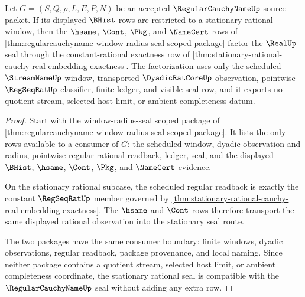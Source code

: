 \begin{theorem}
\label{thm:regularcauchyname-stationary-rational-seal-compatibility}
Let $G=(S,Q,\rho,L,E,P,N)$ be an accepted $\RegularCauchyNameUp$ source packet. If its displayed $\BHist$ rows are restricted to a stationary rational window, then the $\hsame$, $\Cont$, $\Pkg$, and $\NameCert$ rows of \autoref{thm:regularcauchyname-window-radius-seal-scoped-package} factor the $\RealUp$ seal through the constant-rational exactness row of \autoref{thm:stationary-rational-cauchy-real-embedding-exactness}. The factorization uses only the scheduled $\StreamNameUp$ window, transported $\DyadicRatCoreUp$ observation, pointwise $\RegSeqRatUp$ classifier, finite ledger, and visible seal row, and it exports no quotient stream, selected host limit, or ambient completeness datum.
\end{theorem}
\begin{proof}
Start with the window-radius-seal scoped package of \autoref{thm:regularcauchyname-window-radius-seal-scoped-package}. It lists the only rows available to a consumer of $G$: the scheduled window, dyadic observation and radius, pointwise regular rational readback, ledger, seal, and the displayed $\BHist$, $\hsame$, $\Cont$, $\Pkg$, and $\NameCert$ evidence.

On the stationary rational subcase, the scheduled regular readback is exactly the constant $\RegSeqRatUp$ member governed by \autoref{thm:stationary-rational-cauchy-real-embedding-exactness}. The $\hsame$ and $\Cont$ rows therefore transport the same displayed rational observation into the stationary seal route.

The two packages have the same consumer boundary: finite windows, dyadic observations, regular readback, package provenance, and local naming. Since neither package contains a quotient stream, selected host limit, or ambient completeness coordinate, the stationary rational seal is compatible with the $\RegularCauchyNameUp$ seal without adding any extra row.
\end{proof}

